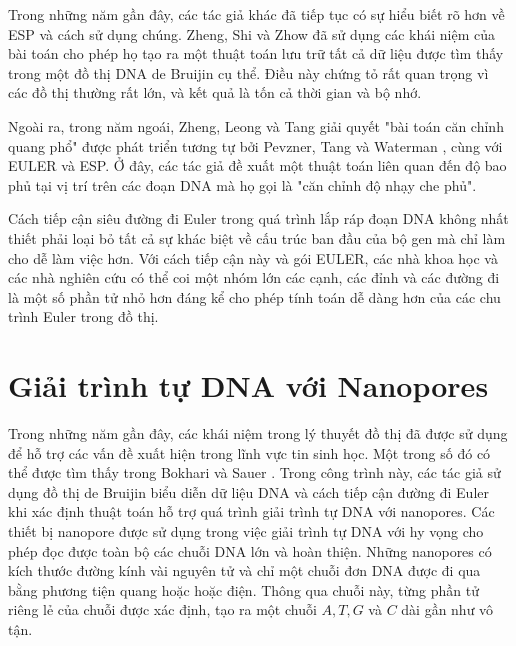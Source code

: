 \documentclass[14pt, a4paper]{article}
\numberwithin{equation}{section}
\numberwithin{figure}{section}
\numberwithin{dl}{section}
\numberwithin{md}{section}
\numberwithin{bd}{section}
\numberwithin{dn}{section}
\numberwithin{hq}{section}
\begin{document}
    Trong những năm gần đây, các tác giả khác đã tiếp tục có sự hiểu biết rõ hơn về ESP và cách sử dụng chúng.
    Zheng, Shi và Zhow \cite{zheng2004parallel} đã sử dụng các khái niệm của bài toán cho phép họ tạo ra một thuật toán lưu trữ tất cả dữ liệu được tìm thấy trong một đồ thị DNA de Bruijin cụ thể.
    Điều này chứng tỏ rất quan trọng vì các đồ thị thường rất lớn, và kết quả là tốn cả thời gian và bộ nhớ.

    Ngoài ra, trong năm ngoái, Zheng, Leong và Tang \cite{zhengimproved} giải quyết "bài toán căn chỉnh quang phổ" được phát triển tương tự bởi Pevzner, Tang và Waterman \cite{pevzner2001eulerian}, \cite{pevzner2001new} cùng với EULER và ESP.
    Ở đây, các tác giả đề xuất một thuật toán liên quan đến độ bao phủ tại vị trí trên các đoạn DNA mà họ gọi là "căn chỉnh độ nhạy che phủ".

    Cách tiếp cận siêu đường đi Euler trong quá trình lắp ráp đoạn DNA không nhất thiết phải loại bỏ tất cả sự khác biệt về cấu trúc ban đầu của bộ gen mà chỉ làm cho dễ làm việc hơn.
    Với cách tiếp cận này và gói EULER, các nhà khoa học và các nhà nghiên cứu có thể coi một nhóm lớn các cạnh, các đỉnh và các đường đi là một số phần tử nhỏ hơn đáng kể cho phép tính toán dễ dàng hơn của các chu trình Euler trong đồ thị.

    \section{Giải trình tự DNA với Nanopores}

    Trong những năm gần đây, các khái niệm trong lý thuyết đồ thị đã được sử dụng để hỗ trợ các vấn đề xuất hiện trong lĩnh vực tin sinh học.
    Một trong số đó có thể được tìm thấy trong Bokhari và Sauer \cite{bokhari2005parallel}.
    Trong công trình này, các tác giả sử dụng đồ thị de Bruijin biểu diễn dữ liệu DNA và cách tiếp cận đường đi Euler khi xác định thuật toán hỗ trợ quá trình giải trình tự DNA với nanopores.
    Các thiết bị nanopore được sử dụng trong việc giải trình tự DNA với hy vọng cho phép đọc được toàn bộ các chuỗi DNA lớn và hoàn thiện.
    Những nanopores có kích thước đường kính vài nguyên tử và chỉ một chuỗi đơn DNA được đi qua bằng phương tiện quang hoặc hoặc điện.
    Thông qua chuỗi này, từng phần tử riêng lẻ của chuỗi được xác định, tạo ra một chuỗi $A, T, G$ và $C$ dài gần như vô tận.


    \newpage
    \printbibliography[title={TÀI LIỆU THAM KHẢO}]
\end{document}
